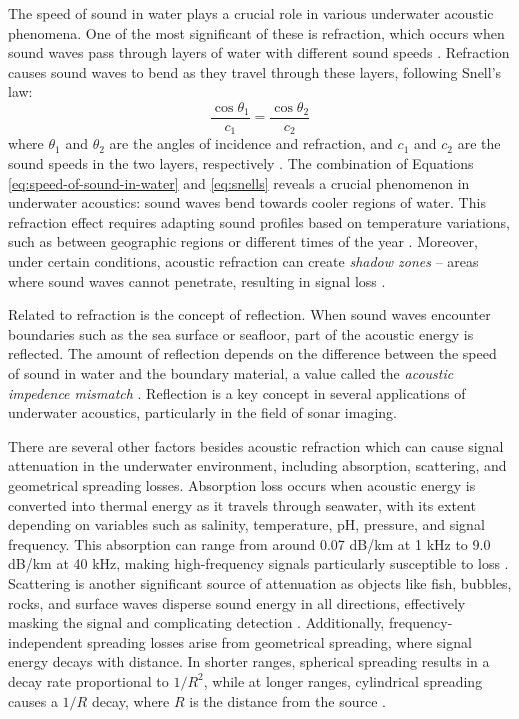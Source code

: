 The speed of sound in water plays a crucial role in various underwater acoustic phenomena. One of the most significant of these is refraction, which occurs when sound waves pass through layers of water with different sound speeds \cite{urick_principles_1975}. Refraction causes sound waves to bend as they travel through these layers, following Snell's law:
\begin{equation}
    \frac{\cos \theta_1}{c_1} = \frac{\cos \theta_2}{c_2}\label{eq:snells}
\end{equation}
where $\theta_1$ and $\theta_2$ are the angles of incidence and refraction, and $c_1$ and $c_2$ are the sound speeds in the two layers, respectively \cite{domingos_survey_2022}.  The combination of Equations \ref{eq:speed-of-sound-in-water} and \ref{eq:snells} reveals a crucial phenomenon in underwater acoustics: sound waves bend towards cooler regions of water. This refraction effect requires adapting sound profiles based on temperature variations, such as between geographic regions or different times of the year \cite[3]{domingos_survey_2022}. Moreover, under certain conditions, acoustic refraction can create \textit{shadow zones} -- areas where sound waves cannot penetrate, resulting in signal loss \cite{vaccaro_past_1998}.

Related to refraction is the concept of reflection. When sound waves encounter boundaries such as the sea surface or seafloor, part of the acoustic energy is reflected. The amount of reflection depends on the difference between the speed of sound in water and the boundary material, a value called the \textit{acoustic impedence mismatch} \cite{jackson_high-frequency_2007}. Reflection is a key concept in several applications of underwater acoustics, particularly in the field of sonar imaging. 

There are several other factors besides acoustic refraction which can cause signal attenuation in the underwater environment, including absorption, scattering, and geometrical spreading losses. Absorption loss occurs when acoustic energy is converted into thermal energy as it travels through seawater, with its extent depending on variables such as salinity, temperature, pH, pressure, and signal frequency. This absorption can range from around 0.07 dB/km at 1 kHz to 9.0 dB/km at 40 kHz, making high-frequency signals particularly susceptible to loss \cite{bjorno_applied_2017, vaccaro_past_1998}. Scattering is another significant source of attenuation as objects like fish, bubbles, rocks, and surface waves disperse sound energy in all directions, effectively masking the signal and complicating detection \cite{bjorno_applied_2017}. Additionally, frequency-independent spreading losses arise from geometrical spreading, where signal energy decays with distance. In shorter ranges, spherical spreading results in a decay rate proportional to $1/R^2$, while at longer ranges, cylindrical spreading causes a $1/R$ decay, where $R$ is the distance from the source \cite{vaccaro_past_1998}.

